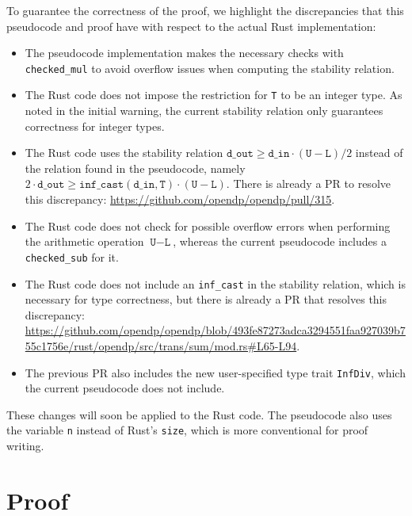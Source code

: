 \documentclass[11pt,a4paper]{article}
\theoremstyle{definition}
\newcommand{\din}{\texttt{d\_in}}
\newcommand{\dout}{\texttt{d\_out}}
\begin{document}
To guarantee the correctness of the proof, we highlight the discrepancies that this pseudocode and proof have with respect to the actual Rust implementation:
\begin{itemize}
    \item The pseudocode implementation makes the necessary checks with \texttt{checked\_mul} to avoid overflow issues when computing the stability relation. 
    \item The Rust code does not impose the restriction for \texttt{T} to be an integer type. As noted in the initial warning, the current stability relation only guarantees correctness for integer types.
    \item The Rust code uses the stability relation $\dout \geq \din \cdot (\texttt{U}-\texttt{L})/2$ instead of the relation found in the pseudocode, namely $2\cdot \dout \geq \texttt{inf\_cast}(\din, \texttt{T})\cdot (\texttt{U}-\texttt{L})$. There is already a PR to resolve this discrepancy: \url{https://github.com/opendp/opendp/pull/315}.
    \item The Rust code does not check for possible overflow errors when performing the arithmetic operation $\texttt{U}-\texttt{L}$, whereas the current pseudocode includes a \texttt{checked\_sub} for it.
    \item The Rust code does not include an \texttt{inf\_cast} in the stability relation, which is necessary for type correctness, but there is already a PR that resolves this discrepancy: \url{https://github.com/opendp/opendp/blob/493fe87273adca3294551faa927039b755c1756e/rust/opendp/src/trans/sum/mod.rs#L65-L94}.
    \item The previous PR also includes the new user-specified type trait \texttt{InfDiv}, which the current pseudocode does not include.
\end{itemize}

These changes will soon be applied to the Rust code. The pseudocode also uses the variable \texttt{n} instead of Rust's \texttt{size}, which is more conventional for proof writing.

\section{Proof}
\end{document}
